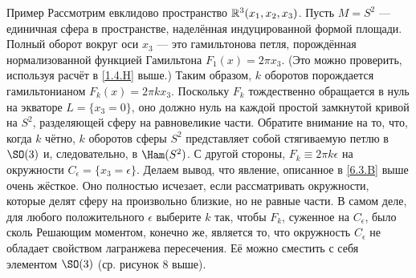 \begin{ex}{Пример}\label{6.3.C}
Рассмотрим евклидово пространство $\mathbb{R}^3 (x_1, x_2, x_3)$.
Пусть $M = S^2$ --- единичная сфера в пространстве, наделённая
индуцированной формой площади. 
Полный оборот вокруг оси $x_3$ --- это гамильтонова петля, порождённая
нормализованной функцией Гамильтона $F_1 (x) = 2\pi x_3$. 
(Это можно проверить, используя расчёт в \ref{1.4.H} выше.)
Таким образом, $k$ оборотов порождается гамильтонианом $F_k (x) = 2\pi k x_3$.
Поскольку $F_k$ тождественно обращается в нуль на экваторе $L = \{x_3
= 0\}$, оно должно  нуль на каждой простой
замкнутой кривой на $S^2$, разделяющей сферу на равновеликие части. 
Обратите внимание на то, что, когда $k$ чётно, $k$ оборотов сферы
$S^2$ представляет собой стягиваемую петлю в $\SO (3)$ и,
следовательно, в $\Ham (S^2)$. 
С другой стороны, $F_k \equiv 2\pi k\epsilon$ на окружности
$C_\epsilon = \{x_3 = \epsilon\}$. 
Делаем вывод, что явление, описанное в \ref{6.3.B} выше очень жёсткое.
Оно полностью исчезает, если рассматривать окружности, которые делят
сферу на произвольно близкие, но не равные части. 
В самом деле, для любого положительного $\epsilon$ выберите $k$ так,
чтобы $F_k$, суженное на $C_\epsilon$, было сколь 
Решающим моментом, конечно же, является то, что окружность
$C_\epsilon$ не обладает свойством лагранжева пересечения. 
Её можно сместить с себя элементом $\SO (3)$ (ср. рисунок 8 выше). 
\end{ex}
